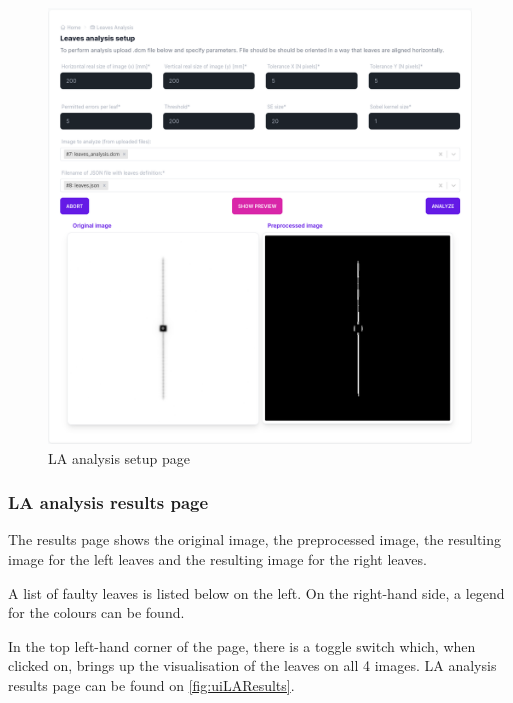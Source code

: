 \begin{figure}
    \centering
    \includegraphics[width=1\textwidth]{Content/Images/ui_la_setup_page.png}
    \caption{LA analysis setup page}
    \label{fig:uiLASetup}
\end{figure}

\subsubsection{LA analysis results page}

The results page shows the original image, the preprocessed image, the resulting image for the left leaves and the resulting image for the right leaves.

A list of faulty leaves is listed below on the left. On the right-hand side, a legend for the colours can be found.

In the top left-hand corner of the page, there is a toggle switch which, when clicked on, brings up the visualisation of the leaves on all 4 images. LA analysis results page can be found on \autoref{fig:uiLAResults}.

